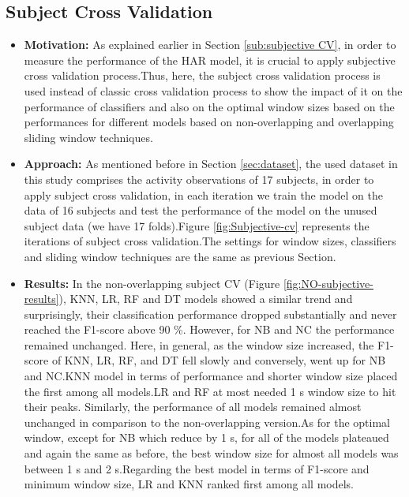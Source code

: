 \begin{itemize}
     
     
\end{itemize}
\subsection{Subject Cross Validation}

\begin{itemize}
 \item[] \textbf{Motivation:}
 As explained earlier in Section \ref{sub:subjective CV}, in order to measure the performance of the HAR model, it is crucial to apply subjective cross validation process.Thus, here, the subject cross validation process is used instead of classic cross validation process to show the impact of it on the performance of classifiers and also on the optimal window sizes based on the performances for different models based on non-overlapping and overlapping sliding window techniques. 
 
 \item[] \textbf{Approach:}
 As mentioned before in Section \ref{sec:dataset}, the used dataset in this study comprises the activity observations of 17 subjects, in order to apply subject cross validation, in each iteration we train the model on the data of 16 subjects and test the performance of the model on the unused subject data (we have 17 folds).Figure \ref{fig:Subjective-cv} represents the iterations of subject cross validation.The settings for window sizes, classifiers and sliding window techniques are the same as previous Section.
 \item[] \textbf{Results:}
In the non-overlapping subject CV (Figure \ref{fig:NO-subjective-results}), KNN, LR, RF and DT models showed a similar trend and surprisingly, their classification performance dropped substantially and never reached the F1-score above 90 \%. However, for NB and NC the performance remained unchanged. Here, in general,  as the window size increased, the F1-score of KNN, LR, RF, and DT fell slowly and conversely, went up for NB and NC.KNN model in terms of performance and shorter window size placed the first among all models.LR and RF at most needed 1 s window size to hit their peaks.\newline
Similarly, the performance of all models remained almost unchanged in comparison to the non-overlapping version.As for the optimal window, except for NB which reduce by 1 s, for all of the models plateaued and again the same as before, the best window size for almost all models was between 1 s and 2 s.Regarding the best model in terms of F1-score and minimum window size, LR and KNN ranked first among all models.   





 
 \end{itemize}

